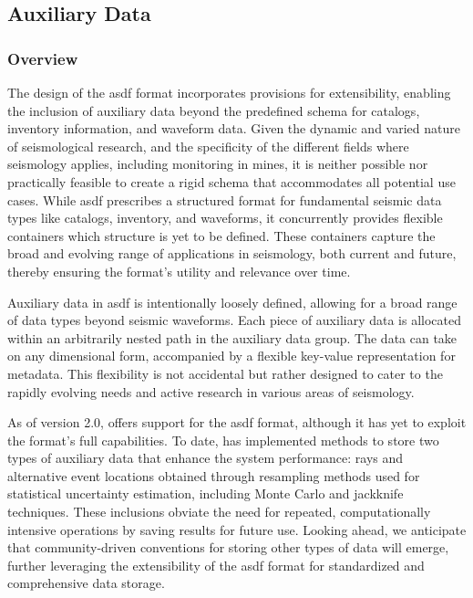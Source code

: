  
\subsection{Auxiliary Data}

\subsubsection{Overview}

The design of the \gls{asdf} format incorporates provisions for extensibility, enabling the inclusion of auxiliary data beyond the predefined schema for catalogs, inventory information, and waveform data. Given the dynamic and varied nature of seismological research, and the specificity of the different fields where seismology applies, including \museismic monitoring in mines, it is neither possible nor practically feasible to create a rigid schema that accommodates all potential use cases. While \gls{asdf} prescribes a structured format for fundamental seismic data types like catalogs, inventory, and waveforms, it concurrently provides flexible containers which structure is yet to be defined. These containers capture the broad and evolving range of applications in seismology, both current and future, thereby ensuring the format's utility and relevance over time.

Auxiliary data in \gls{asdf} is intentionally loosely defined, allowing for a broad range of data types beyond seismic waveforms. Each piece of auxiliary data is allocated within an arbitrarily nested path in the auxiliary data group. The data can take on any dimensional form, accompanied by a flexible key-value representation for metadata. This flexibility is not accidental but rather designed to cater to the rapidly evolving needs and active research in various areas of seismology.

As of version 2.0, \muquake offers support for the \gls{asdf} format, although it has yet to exploit the format's full capabilities. To date, \muquake has implemented methods to store two types of auxiliary data that enhance the system performance: rays and alternative event locations obtained through resampling methods used for statistical uncertainty estimation, including Monte Carlo and jackknife techniques. These inclusions obviate the need for repeated, computationally intensive operations by saving results for future use. Looking ahead, we anticipate that community-driven conventions for storing other types of data will emerge, further leveraging the extensibility of the \gls{asdf} format for standardized and comprehensive data storage.


